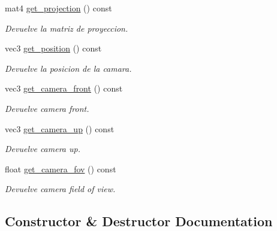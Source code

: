 \begin{DoxyCompactItemize}
mat4 \mbox{\hyperlink{classexample_1_1_camera_a3360041bcaca72ff4ad85e93dd6c0044}{get\+\_\+projection}} () const
\begin{DoxyCompactList}\small\item\em Devuelve la matriz de proyeccion. \end{DoxyCompactList}\item 
vec3 \mbox{\hyperlink{classexample_1_1_camera_ab031bb4b8fc48d8654c95619c1d5b6d4}{get\+\_\+position}} () const
\begin{DoxyCompactList}\small\item\em Devuelve la posicion de la camara. \end{DoxyCompactList}\item 
vec3 \mbox{\hyperlink{classexample_1_1_camera_a0ad064a98aa910853f35741858c64eaf}{get\+\_\+camera\+\_\+front}} () const
\begin{DoxyCompactList}\small\item\em Devuelve camera front. \end{DoxyCompactList}\item 
vec3 \mbox{\hyperlink{classexample_1_1_camera_a517cbf4dc63f932664ac24acdf991e2e}{get\+\_\+camera\+\_\+up}} () const
\begin{DoxyCompactList}\small\item\em Devuelve camera up. \end{DoxyCompactList}\item 
float \mbox{\hyperlink{classexample_1_1_camera_a439177a28f84f352c046ec2d315f6de2}{get\+\_\+camera\+\_\+fov}} () const
\begin{DoxyCompactList}\small\item\em Devuelve camera field of view. \end{DoxyCompactList}\end{DoxyCompactItemize}


\subsection{Constructor \& Destructor Documentation}
\mbox{\label{classexample_1_1_camera_ace573e0e67cfac4f812d17739d23e89e}} 
